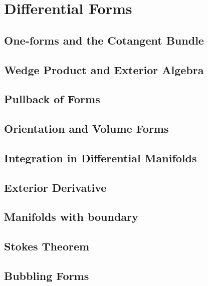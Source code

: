 
\section{Differential Forms}
\label{Section3}

\subsection{One-forms and the Cotangent Bundle}

\subsection{Wedge Product and Exterior Algebra}

\subsection{Pullback of Forms}

\subsection{Orientation and Volume Forms}

\subsection{Integration in Differential Manifolds}

\subsection{Exterior Derivative}

\subsection{Manifolds with boundary}

\subsection{Stokes Theorem}

\subsection{Bubbling Forms}

\cleardoublepage